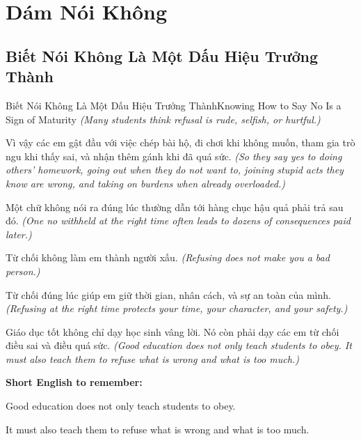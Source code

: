 \chapter{Dám Nói Không}

\section{Biết Nói Không Là Một Dấu Hiệu Trưởng Thành}
\begin{truyen}{Biết Nói Không Là Một Dấu Hiệu Trưởng Thành}{Knowing How to Say No Is a Sign of Maturity}
\textit{(Many students think refusal is rude, selfish, or hurtful.)}

Vì vậy các em gật đầu với việc chép bài hộ, đi chơi khi không muốn, tham gia trò ngu khi thấy sai, và nhận thêm gánh khi đã quá sức.
\textit{(So they say yes to doing others’ homework, going out when they do not want to, joining stupid acts they know are wrong, and taking on burdens when already overloaded.)}

Một chữ không nói ra đúng lúc thường dẫn tới hàng chục hậu quả phải trả sau đó.
\textit{(One no withheld at the right time often leads to dozens of consequences paid later.)}

Từ chối không làm em thành người xấu.
\textit{(Refusing does not make you a bad person.)}

Từ chối đúng lúc giúp em giữ thời gian, nhân cách, và sự an toàn của mình.
\textit{(Refusing at the right time protects your time, your character, and your safety.)}

\end{truyen}

\begin{baihoc}
Giáo dục tốt không chỉ dạy học sinh vâng lời. Nó còn phải dạy các em từ chối điều sai và điều quá sức.
\textit{(Good education does not only teach students to obey. It must also teach them to refuse what is wrong and what is too much.)}
\end{baihoc}

\begin{ghinhoanh}
\textbf{Short English to remember:}

Good education does not only teach students to obey.

It must also teach them to refuse what is wrong and what is too much.

\end{ghinhoanh}

